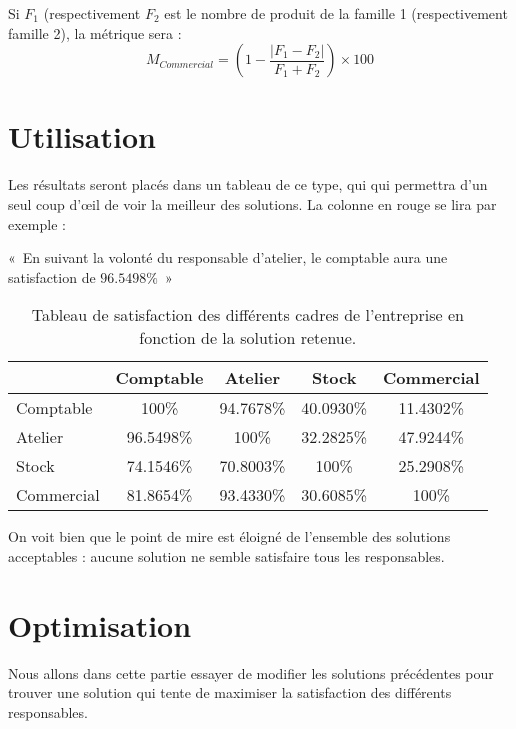 Si $F_1$ (respectivement $F_2$ est le nombre de produit de la famille 1
(respectivement famille 2), la métrique sera :
$$
M_{Commercial} = \left( 1 - \frac{|F_1 - F_2|}{F_1 + F_2} \right) \times 100
$$

\section{Utilisation}
Les résultats seront placés dans un tableau de ce type, qui qui permettra d'un
seul coup d'œil de voir la meilleur des solutions.
La colonne en rouge se lira par exemple : 
\begin{center}
«~En suivant la volonté du responsable d'atelier, le comptable aura une
satisfaction de $96.5498\%$~»
\end{center}

\begin{table}[!ht]
    \begin{center}
    \begin{tabular}{|l|c|c|c|c|}
\hline
\cellcolor[gray]{0.9} & Comptable& Atelier & Stock & Commercial  \\
\hline
Comptable			& \cellcolor[gray]{0.9} 100\% & 94.7678\% & 40.0930\%			  & 11.4302\% \\
\hline
Atelier				& \cellcolor{red}   96.5498\% &
\cellcolor[gray]{0.9} 100\% & 32.2825\%			  & 47.9244\% \\
\hline
Stock			        & 74.1546\%		      & 70.8003\%		    & \cellcolor[gray]{0.9} 100\% & 25.2908\% \\
\hline
Commercial			& 81.8654\%		      & 93.4330\%
& 30.6085\%                   & \cellcolor[gray]{0.9} 100\% \\
\hline
    \end{tabular}
    \end{center}
    \caption{Tableau de satisfaction des différents cadres de l'entreprise en
	fonction de la solution retenue.}
\end{table}

On voit bien que le point de mire est éloigné de l'ensemble des solutions
acceptables : aucune solution ne semble satisfaire tous les responsables.

\section{Optimisation}
Nous allons dans cette partie essayer de modifier les solutions précédentes
pour trouver une solution qui tente de maximiser la satisfaction des différents
responsables.

